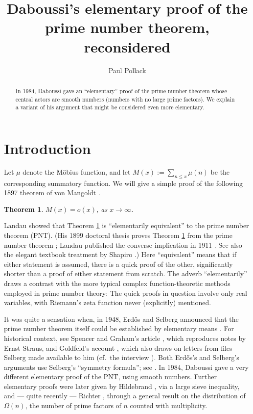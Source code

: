 \documentclass[11pt]{amsart}
\title[Daboussi's elementary proof, reconsidered]{Daboussi's elementary proof of the prime number theorem, reconsidered}
\author{Paul Pollack}
\date{}
\newtheorem{theorem}{Theorem}
\theoremstyle{remark}
\begin{document}
\begin{abstract} In 1984, Daboussi gave an ``elementary'' proof of the prime number theorem whose central actors are smooth numbers (numbers with no large prime factors). We explain a variant of his argument that might be considered even more elementary.
\end{abstract}
\maketitle

\section{Introduction}
Let $\mu$ denote the M\"obius function, and let $M(x):=\sum_{n\le x}\mu(n)$ be the corresponding summatory function. We will give a simple proof of the following 1897 theorem of von Mangoldt \cite{mangoldt}.
\begin{theorem}\label{thm:main}
$M(x)=o(x)$, as $x\to\infty$.
\end{theorem}

Landau showed that Theorem \ref{thm:main} is ``elementarily equivalent'' to the prime number theorem (PNT). (His 1899 doctoral thesis proves Theorem \ref{thm:main} from the prime number theorem \cite[pp.~6--16]{landau-thesis}; Landau published the converse implication in 1911 \cite[pp.~973--979]{landau-equivalence}. See also the elegant textbook treatment by Shapiro \cite[\S10.3, pp.~408--414]{shapiro}.) Here ``equivalent'' means that if either statement is assumed, there is a quick proof of the other, significantly shorter than a proof of either statement from scratch. The adverb ``elementarily'' draws a contrast with the more typical complex function-theoretic methods employed in prime number theory: The quick proofs in question involve only real variables, with Riemann's zeta function never (explicitly) mentioned.

It was quite a sensation when, in 1948, Erd\H{o}s and Selberg
announced that the prime number theorem itself could be established by
elementary means \cite{erdos,selberg}. For historical context, see Spencer and Graham's article \cite{spencer-graham}, which reproduces notes by Ernst Straus, and Goldfeld's account \cite{goldfeld}, which also draws on letters from files Selberg made available to him (cf.~the interview \cite{BS08}).
Both Erd\H{o}s's and Selberg's arguments use Selberg's ``symmetry
formula''; see \cite[eq.~(10.4.10), p.~419]{shapiro}.
In 1984, Daboussi \cite{daboussi} gave a very different elementary
proof of the PNT, using smooth numbers. Further elementary proofs
were later given by Hildebrand \cite{hildebrand}, via a large sieve
inequality, and --- quite recently --- Richter \cite{richter}, through a general result
on the distribution of $\Omega(n)$, the number of prime factors
of $n$ counted with multiplicity.
\end{document}
